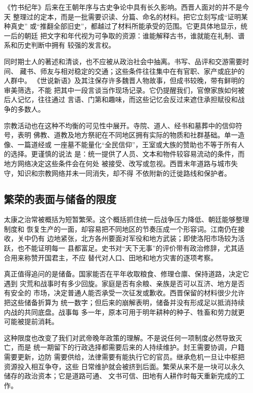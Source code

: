 《竹书纪年》后来在王朝年序与古史争论中具有长久影响。西晋人面对的并不是今天
整理过的定本，而是一批需要识读、分篇、命名的材料。把它立刻写成“证明某种真史”
或“推翻全部旧史”，都越过了材料所能承受的范围。它更具体地显示，统一后的朝廷
把文字和年代视为可争取的资源：谁能解释古书，谁就能在礼制、谱系和历史判断中拥有
较强的发言权。

同时期士人的著述和清谈，也不应被从政治社会中抽离。书写、品评和交游需要时间、
藏书、师友与相对稳定的交通；这些条件往往集中在有官职、家产或庇护的人群中。
《世说新语》及其注保存许多魏晋人物故事，但成书较晚，带有鲜明的审美筛选，不能
把其中一段言谈当作现场记录。它仍提醒我们，官僚家族如何被后人记忆，往往通过
言语、门第和趣味，而这些记忆会反过来遮住承担赋役和战争的多数人。

宗教活动也在这种不均衡的可见性中展开。寺院、道人、经书和墓葬中的信仰符号，表明
佛教、道教及地方祭祀在不同地区拥有实际的物质和社群基础。单一造像、一篇道经或
一座墓不能量化“全民信仰”，王室或大族的赞助也不等于所有人的选择。更谨慎的说法
是：统一提供了人员、文本和物件较容易流动的条件，而地方网络决定这些条件会在何处
被接受、改写或忽视。西晋末年道路与城市失守，知识和宗教网络并未一同消失，却不得
不依附新的迁徙路线和保护者。

\subsection{繁荣的表面与储备的限度}

太康之治常被概括为短暂繁荣。这个概括抓住统一后战争压力降低、朝廷能够整理制度和
恢复生产的一面，却容易把不同地区的节奏压成一个形容词。江南仍在接收，关中仍有
边地紧张，北方各州要面对军役和地方武装；即使洛阳市场较为活跃，也不能证明每一
县都富足。史书对“天下无事”的评价带有政治修辞，尤其适合用来称赞开国君主，不应
替代对人口、田地和地方灾害的逐项考察。

真正值得追问的是储备。国家能否在平年收取粮食、修理仓廪、保持道路，决定它遇到
灾荒和战事时有多少回旋。家庭是否有余粮、亲族是否可以互济、地方是否有安全的
市场，决定普通人能否承受一次征发或歉收。西晋保留的材料很少允许把这些储备折算为
统一数字；但后来的崩解表明，储备并没有形成足以抵消持续内战的共同底盘。战事每
多一年，原本可用于明年耕种的种子、牲畜和劳力就更可能被提前消耗。

这种限度也改变了我们对武帝晚年政策的理解。不是说任何一项制度必然导致灭亡，而是
统一期留下的行政选择都需要后来的人持续维护。封王需要协调，户籍需要更新，边防
需要供给，法律需要有能执行它的官员。继承危机一旦让中枢把资源投入相互争夺，这些
日常维护就会被挤到后面。繁荣从来不是一块可以永久储存的政治资本；它是道路可通、
文书可信、田地有人耕作时每天重新完成的工作。

